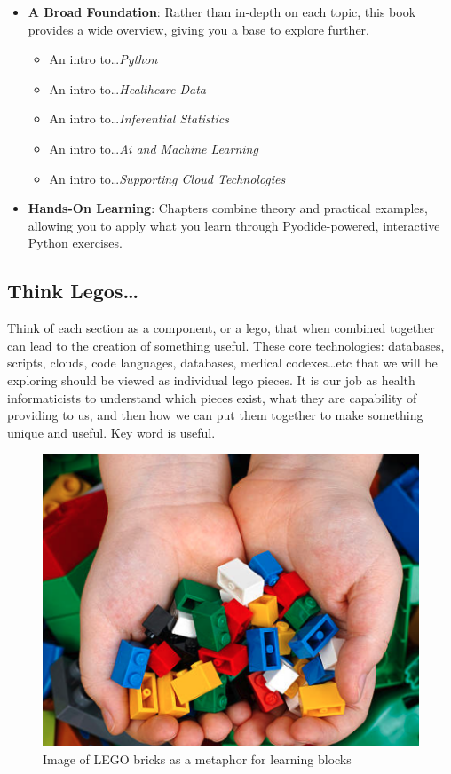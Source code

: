 \documentclass[
  letterpaper,
  DIV=11,
  numbers=noendperiod]{scrreprt}
\providecommand{\tightlist}{%
  \setlength{\itemsep}{0pt}\setlength{\parskip}{0pt}}\usepackage{longtable,booktabs,array}
\theoremstyle{remark}
\begin{document}
\begin{itemize}
\tightlist
\item
  \textbf{A Broad Foundation}: Rather than in-depth on each topic, this
  book provides a wide overview, giving you a base to explore further.

  \begin{itemize}
  \tightlist
  \item
    An intro to\ldots{}\emph{Python}
  \item
    An intro to\ldots{}\emph{Healthcare Data}
  \item
    An intro to\ldots{}\emph{Inferential Statistics}
  \item
    An intro to\ldots{}\emph{Ai and Machine Learning}
  \item
    An intro to\ldots{}\emph{Supporting Cloud Technologies}
  \end{itemize}
\item
  \textbf{Hands-On Learning}: Chapters combine theory and practical
  examples, allowing you to apply what you learn through
  Pyodide-powered, interactive Python exercises.
\end{itemize}

\subsection*{Think Legos\ldots{}}\label{think-legos}

Think of each section as a component, or a lego, that when combined
together can lead to the creation of something useful. These core
technologies: databases, scripts, clouds, code languages, databases,
medical codexes\ldots etc that we will be exploring should be viewed as
individual lego pieces. It is our job as health informaticists to
understand which pieces exist, what they are capability of providing to
us, and then how we can put them together to make something unique and
useful. Key word is useful.

\begin{figure}[H]

{\centering \includegraphics{lego.png}

}

\caption{Image of LEGO bricks as a metaphor for learning blocks}

\end{figure}%
\end{document}
